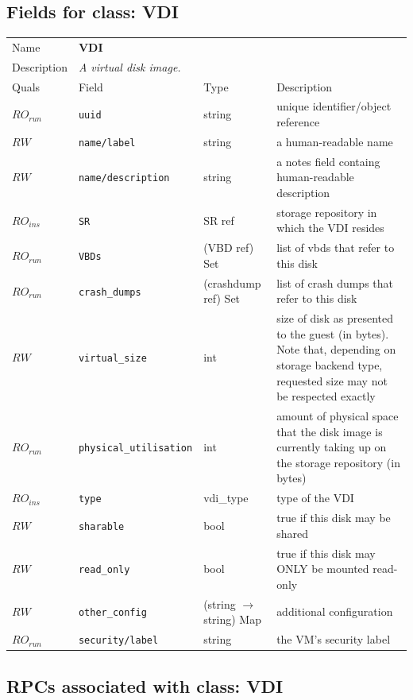 \subsection{Fields for class: VDI}
\begin{longtable}{|lllp{}|}
\hline
\multicolumn{1}{|l}{Name} & \multicolumn{3}{l|}{\bf VDI} \\
\multicolumn{1}{|l}{Description} & \multicolumn{3}{l|}{\parbox{11cm}{\em A
virtual disk image.}} \\
\hline
Quals & Field & Type & Description \\
\hline
$\mathit{RO}_\mathit{run}$ &  {\tt uuid} & string & unique identifier/object reference \\
$\mathit{RW}$ &  {\tt name/label} & string & a human-readable name \\
$\mathit{RW}$ &  {\tt name/description} & string & a notes field containg human-readable description \\
$\mathit{RO}_\mathit{ins}$ &  {\tt SR} & SR ref & storage repository in which the VDI resides \\
$\mathit{RO}_\mathit{run}$ &  {\tt VBDs} & (VBD ref) Set & list of vbds that refer to this disk \\
$\mathit{RO}_\mathit{run}$ &  {\tt crash\_dumps} & (crashdump ref) Set & list of crash dumps that refer to this disk \\
$\mathit{RW}$ &  {\tt virtual\_size} & int & size of disk as presented to the guest (in bytes). Note that, depending on storage backend type, requested size may not be respected exactly \\
$\mathit{RO}_\mathit{run}$ &  {\tt physical\_utilisation} & int & amount of physical space that the disk image is currently taking up on the storage repository (in bytes) \\
$\mathit{RO}_\mathit{ins}$ &  {\tt type} & vdi\_type & type of the VDI \\
$\mathit{RW}$ &  {\tt sharable} & bool & true if this disk may be shared \\
$\mathit{RW}$ &  {\tt read\_only} & bool & true if this disk may ONLY be mounted read-only \\
$\mathit{RW}$ &  {\tt other\_config} & (string $\rightarrow$ string) Map & additional configuration \\
$\mathit{RO}_\mathit{run}$ &  {\tt security/label} & string & the VM's security label \\
\hline
\end{longtable}
\subsection{RPCs associated with class: VDI}
